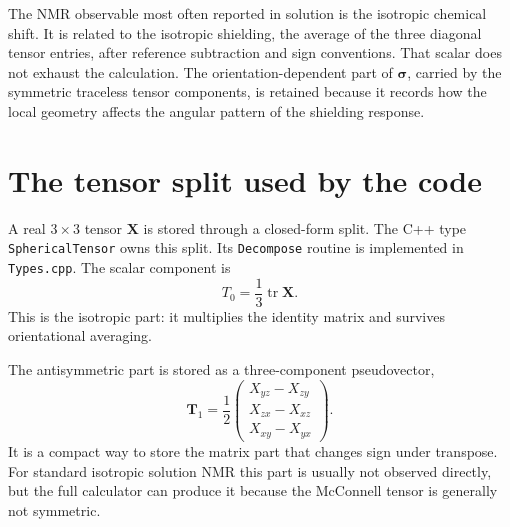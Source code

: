 \documentclass[11pt]{article}
\begin{document}
The NMR observable most often reported in solution is the isotropic chemical
shift. It is related to the isotropic shielding, the average of the three
diagonal tensor entries, after reference subtraction and sign conventions. That
scalar does not exhaust the calculation. The orientation-dependent part of
\(\bm\sigma\), carried by the symmetric traceless tensor components, is retained
because it records how the local geometry affects the angular pattern of the
shielding response.

\section{The tensor split used by the code}

A real \(3\times 3\) tensor \(\bm X\) is stored through a closed-form
split. The C++ type \texttt{SphericalTensor} owns this split. Its
\texttt{Decompose} routine is implemented in \texttt{Types.cpp}.
The scalar component is
\begin{equation}
  T_0 = \frac{1}{3}\operatorname{tr}\bm X .
  \label{eq:t0}
\end{equation}
This is the isotropic part: it multiplies the identity matrix and survives
orientational averaging.

The antisymmetric part is stored as a three-component pseudovector,
\begin{equation}
  \bm T_1 =
  \frac{1}{2}
  \begin{pmatrix}
    X_{yz}-X_{zy}\\
    X_{zx}-X_{xz}\\
    X_{xy}-X_{yx}
  \end{pmatrix}.
  \label{eq:t1}
\end{equation}
It is a compact way to store the matrix part that changes sign under transpose.
For standard isotropic solution NMR this part is usually not observed directly,
but the full calculator can produce it because the McConnell tensor is generally
not symmetric.
\end{document}
